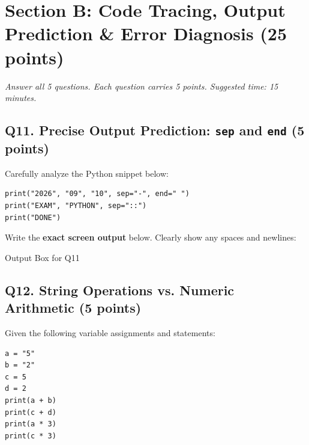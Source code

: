 \documentclass[11pt,a4paper]{article}
\begin{document}



\section*{Section B: Code Tracing, Output Prediction \& Error Diagnosis \hfill \normalsize\normalfont(25 points)}

\textit{Answer all 5 questions. Each question carries 5 points. Suggested time: 15 minutes.}

\vspace{0.08cm}

\subsection*{Q11. Precise Output Prediction: \texttt{sep} and \texttt{end} (5 points)}

Carefully analyze the Python snippet below:

\begin{lstlisting}
print("2026", "09", "10", sep="-", end=" ")
print("EXAM", "PYTHON", sep="::")
print("DONE")
\end{lstlisting}

Write the \textbf{exact screen output} below. Clearly show any spaces and newlines:

\begin{answerbox}[height=2.0cm]{Output Box for Q11}

\vspace{0.03cm}

\end{answerbox}

\vspace{0.08cm}

\newpage

\subsection*{Q12. String Operations vs. Numeric Arithmetic (5 points)}

Given the following variable assignments and statements:

\begin{lstlisting}
a = "5"
b = "2"
c = 5
d = 2
print(a + b)
print(c + d)
print(a * 3)
print(c * 3)
\end{lstlisting}
\end{document}
